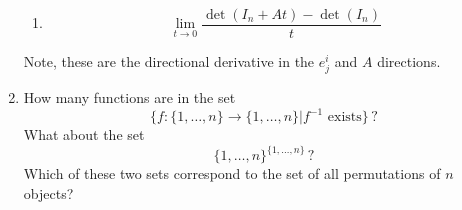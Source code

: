 \begin{enumerate}
\begin{enumerate}
\item \[
\lim_{t \rightarrow 0} \frac{\det(I_n + A t) - \det(I_n)}{t}
\]
\end{enumerate}
Note, these  are the directional derivative in the $e^i_j$ and $A$ directions.


\item How many functions are in the set \[\{ f:\{1,\dots,n\}\to \{1,\dots,n\} | f^{-1} \text{~exists} \}\, ?\] What about the set \[\{1,\dots,n\}^{\{1,\dots,n\}}\, ?\] Which of these two sets correspond to the set of all permutations of $n$ objects?


\end{enumerate}
